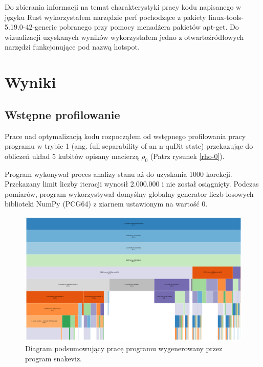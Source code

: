 \documentclass[11pt, a4paper]{article}
\begin{document}
\begin{sloppypar}
    Do zbierania informacji na temat charakterystyki pracy kodu napisanego w języku Rust
    wykorzystałem narzędzie perf pochodzące z pakiety linux-tools-5.19.0-42-generic
    pobranego przy pomocy menadżera pakietów apt-get. Do wizualizacji uzyskanych wyników
    wykorzystałem jedno z otwartoźródłowych narzędzi funkcjonujące pod nazwą hotspot\cite{HOTSPOT}.

    \section{Wyniki}


    \subsection{Wstępne profilowanie}


    Prace nad optymalizacją kodu rozpocząłem od wstępnego profilowania pracy programu w
    trybie 1 (ang. full separability of an n-quDit state) przekazując do obliczeń układ 5
    kubitów opisany macierzą $\rho_{0}$ (Patrz rysunek \ref{rho-0}).

    Program wykonywał proces analizy stanu aż do uzyskania 1000 korekcji. Przekazany
    limit liczby iteracji wynosił 2.000.000 i nie został osiągnięty. Podczas pomiarów, program
    wykorzystywał domyślny globalny generator liczb losowych biblioteki NumPy (PCG64\cite{NumpyDefaultGenerator})
    z ziarnem ustawionym na wartość 0.

    \FloatBarrier
    \begin{figure}[ht]
      \centering
      \includegraphics[width=1.0\textwidth]{"resources/profiling_1/graph.png"}
      \caption{Diagram podsumowujący pracę programu wygenerowany przez program snakeviz.}
      \label{pre-prof-perf}
    \end{figure}


\end{sloppypar}
\end{document}
